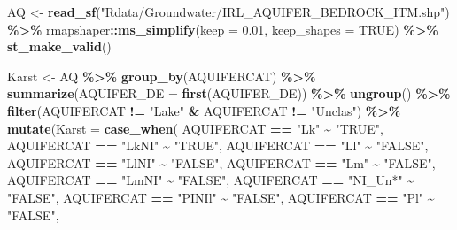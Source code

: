 \documentclass[
  12pt,
]{article}
\newenvironment{Shaded}{\begin{snugshade}}{\end{snugshade}}
\newcommand{\DataTypeTok}[1]{\textcolor[rgb]{0.13,0.29,0.53}{#1}}
\newcommand{\FloatTok}[1]{\textcolor[rgb]{0.00,0.00,0.81}{#1}}
\newcommand{\KeywordTok}[1]{\textcolor[rgb]{0.13,0.29,0.53}{\textbf{#1}}}
\newcommand{\NormalTok}[1]{#1}
\newcommand{\OperatorTok}[1]{\textcolor[rgb]{0.81,0.36,0.00}{\textbf{#1}}}
\newcommand{\OtherTok}[1]{\textcolor[rgb]{0.56,0.35,0.01}{#1}}
\newcommand{\StringTok}[1]{\textcolor[rgb]{0.31,0.60,0.02}{#1}}
\begin{document}
\begin{Shaded}
\begin{Highlighting}[]
\NormalTok{AQ \textless{}{-}}\StringTok{ }\KeywordTok{read\_sf}\NormalTok{(}\StringTok{"Rdata/Groundwater/IRL\_AQUIFER\_BEDROCK\_ITM.shp"}\NormalTok{) }\OperatorTok{\%\textgreater{}\%}
\StringTok{    }\NormalTok{rmapshaper}\OperatorTok{::}\KeywordTok{ms\_simplify}\NormalTok{(}\DataTypeTok{keep =} \FloatTok{0.01}\NormalTok{, }\DataTypeTok{keep\_shapes =} \OtherTok{TRUE}\NormalTok{) }\OperatorTok{\%\textgreater{}\%}
\StringTok{    }\KeywordTok{st\_make\_valid}\NormalTok{()}
  
\NormalTok{  Karst \textless{}{-}}\StringTok{ }\NormalTok{AQ }\OperatorTok{\%\textgreater{}\%}\StringTok{ }
\StringTok{    }\KeywordTok{group\_by}\NormalTok{(AQUIFERCAT) }\OperatorTok{\%\textgreater{}\%}
\StringTok{    }\KeywordTok{summarize}\NormalTok{(}\DataTypeTok{AQUIFER\_DE =} \KeywordTok{first}\NormalTok{(AQUIFER\_DE)) }\OperatorTok{\%\textgreater{}\%}
\StringTok{    }\KeywordTok{ungroup}\NormalTok{() }\OperatorTok{\%\textgreater{}\%}
\StringTok{    }\KeywordTok{filter}\NormalTok{(AQUIFERCAT }\OperatorTok{!=}\StringTok{ "Lake"} \OperatorTok{\&}\StringTok{ }\NormalTok{AQUIFERCAT }\OperatorTok{!=}\StringTok{ "Unclas"}\NormalTok{) }\OperatorTok{\%\textgreater{}\%}
\StringTok{    }\KeywordTok{mutate}\NormalTok{(}\DataTypeTok{Karst =} \KeywordTok{case\_when}\NormalTok{(}
\NormalTok{      AQUIFERCAT }\OperatorTok{==}\StringTok{ "Lk"}     \OperatorTok{\textasciitilde{}}\StringTok{ "TRUE"}\NormalTok{,}
\NormalTok{      AQUIFERCAT }\OperatorTok{==}\StringTok{ "LkNI"}   \OperatorTok{\textasciitilde{}}\StringTok{ "TRUE"}\NormalTok{,}
\NormalTok{      AQUIFERCAT }\OperatorTok{==}\StringTok{ "Ll"}     \OperatorTok{\textasciitilde{}}\StringTok{ "FALSE"}\NormalTok{,                         }
\NormalTok{      AQUIFERCAT }\OperatorTok{==}\StringTok{ "LlNI"}   \OperatorTok{\textasciitilde{}}\StringTok{ "FALSE"}\NormalTok{,                 }
\NormalTok{      AQUIFERCAT }\OperatorTok{==}\StringTok{ "Lm"}     \OperatorTok{\textasciitilde{}}\StringTok{ "FALSE"}\NormalTok{,                }
\NormalTok{      AQUIFERCAT }\OperatorTok{==}\StringTok{ "LmNI"}   \OperatorTok{\textasciitilde{}}\StringTok{ "FALSE"}\NormalTok{,              }
\NormalTok{      AQUIFERCAT }\OperatorTok{==}\StringTok{ "NI\_Un*"} \OperatorTok{\textasciitilde{}}\StringTok{ "FALSE"}\NormalTok{,                  }
\NormalTok{      AQUIFERCAT }\OperatorTok{==}\StringTok{ "PINIl"}  \OperatorTok{\textasciitilde{}}\StringTok{ "FALSE"}\NormalTok{,       }
\NormalTok{      AQUIFERCAT }\OperatorTok{==}\StringTok{ "Pl"}     \OperatorTok{\textasciitilde{}}\StringTok{ "FALSE"}\NormalTok{,      }

\end{Highlighting}
\end{Shaded}
\end{document}
